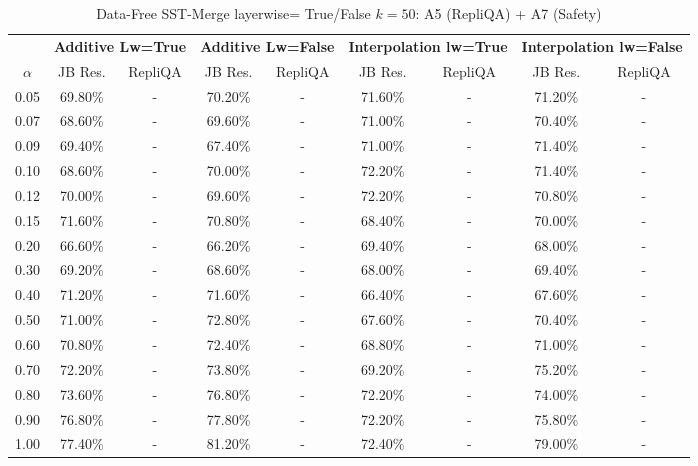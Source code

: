 \begin{table}[h]
\centering
\caption{Data-Free SST-Merge layerwise= True/False $k=50$: A5 (RepliQA) + A7 (Safety)}
\label{tab:res_a5_a7_data_free_sst_50}
\begin{tabular}{c|cc|cc|cc|cc}
\hline
 & \multicolumn{2}{c|}{\textbf{Additive Lw=True}} & \multicolumn{2}{c|}{\textbf{Additive Lw=False}} & \multicolumn{2}{c|}{\textbf{Interpolation lw=True}}& \multicolumn{2}{c}{\textbf{Interpolation lw=False}} \\
$\alpha$ & JB Res. & RepliQA & JB Res. & RepliQA & JB Res. & RepliQA & JB Res. & RepliQA \\
\hline
0.05 & 69.80\% & - & 70.20\% & - & 71.60\% & - & 71.20\% & - \\
0.07 & 68.60\% & - & 69.60\% & - & 71.00\% & - & 70.40\% & - \\
0.09 & 69.40\% & - & 67.40\% & - & 71.00\% & - & 71.40\% & - \\
0.10 & 68.60\% & - & 70.00\% & - & 72.20\% & - & 71.40\% & - \\
0.12 & 70.00\% & - & 69.60\% & - & 72.20\% & - & 70.80\% & - \\
0.15 & 71.60\% & - & 70.80\% & - & 68.40\% & - & 70.00\% & - \\
0.20 & 66.60\% & - & 66.20\% & - & 69.40\% & - & 68.00\% & - \\
0.30 & 69.20\% & - & 68.60\% & - & 68.00\% & - & 69.40\% & - \\
0.40 & 71.20\% & - & 71.60\% & - & 66.40\% & - & 67.60\% & - \\
0.50 & 71.00\% & - & 72.80\% & - & 67.60\% & - & 70.40\% & - \\
0.60 & 70.80\% & - & 72.40\% & - & 68.80\% & - & 71.00\% & - \\
0.70 & 72.20\% & - & 73.80\% & - & 69.20\% & - & 75.20\% & - \\
0.80 & 73.60\% & - & 76.80\% & - & 72.20\% & - & 74.00\% & - \\
0.90 & 76.80\% & - & 77.80\% & - & 72.20\% & - & 75.80\% & - \\
1.00 & 77.40\% & - & 81.20\% & - & 72.40\% & - & 79.00\% & - \\
\hline
\end{tabular}
\end{table}
\FloatBarrier


